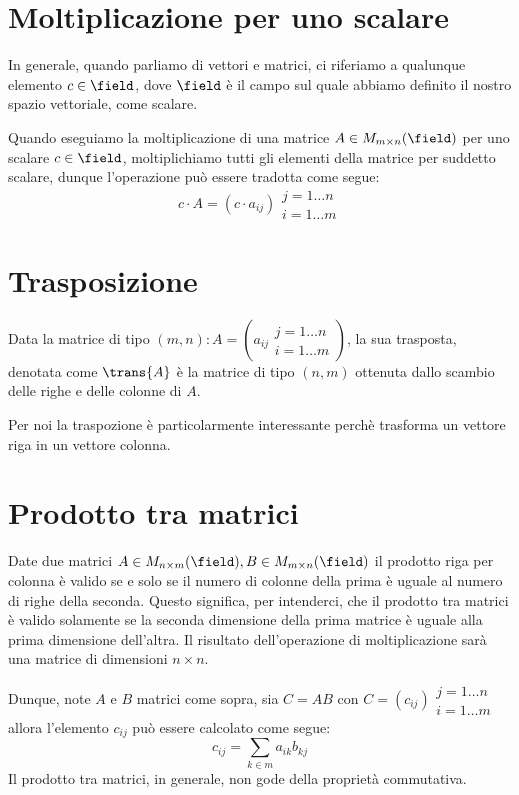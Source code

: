 \section{Moltiplicazione per uno scalare}
In generale, quando parliamo di vettori e matrici, ci riferiamo a qualunque elemento $c \in \field$, dove $\field$ è il campo sul quale abbiamo definito il nostro spazio vettoriale, come scalare.

Quando eseguiamo la moltiplicazione di una matrice $A \in M_{m \times n}(\field)$ per uno scalare $c \in \field$, moltiplichiamo tutti gli elementi della matrice per suddetto scalare, dunque l'operazione può essere tradotta come segue:
\begin{equation*}
    c \cdot A = (c \cdot a_{ij})\substack{\scriptstyle j = 1 \dots n \\ \scriptstyle i = 1 \dots m}
\end{equation*}
\section{Trasposizione}
Data la matrice di tipo $(m, n): A = (a_{ij}\substack{\scriptstyle j = 1 \dots n \\ \scriptstyle i = 1 \dots m})$, la sua trasposta, denotata come $\trans{A}$ è la matrice di tipo $(n, m)$ ottenuta dallo scambio delle righe e delle colonne di $A$.

Per noi la traspozione è particolarmente interessante perchè trasforma un vettore riga in un vettore colonna.
\section{Prodotto tra matrici}
Date due matrici $A \in M_{n \times m}(\field), B \in M_{m \times n}(\field)$ il prodotto riga per colonna è valido se e solo se il numero di colonne della prima è uguale al numero di righe della seconda. Questo significa, per intenderci, che il prodotto tra matrici è valido solamente se la seconda dimensione della prima matrice è uguale alla prima dimensione dell'altra.
Il risultato dell'operazione di moltiplicazione sarà una matrice di dimensioni $n \times n$.

Dunque, note $A$ e $B$ matrici come sopra, sia $C = AB$ con $C = (c_{ij})\substack{\scriptstyle j = 1 \dots n \\ \scriptstyle i = 1 \dots m}$ allora l'elemento $c_{ij}$ può essere calcolato come segue:
\begin{equation*}
    c_{ij} = \sum_{k \in m}a_{ik}b_{kj}
\end{equation*}
Il prodotto tra matrici, in generale, non gode della proprietà commutativa.
